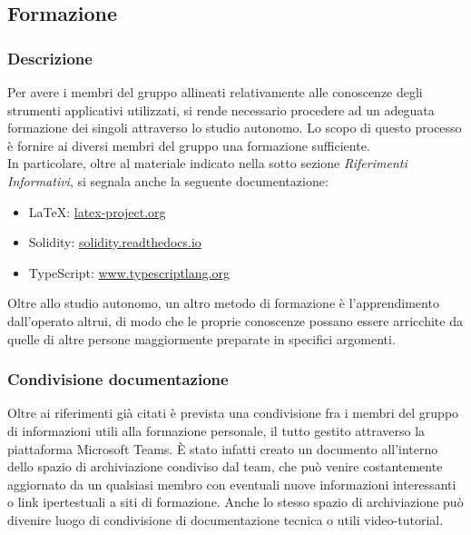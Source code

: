 \subsection{Formazione}
		\subsubsection{Descrizione}	
		Per avere i membri del gruppo \Gruppo{} allineati relativamente alle conoscenze degli strumenti applicativi utilizzati, si rende necessario procedere ad un adeguata formazione dei singoli attraverso lo studio autonomo. Lo scopo di questo processo è fornire ai diversi membri del gruppo una formazione sufficiente.\\
		In particolare, oltre al materiale indicato nella sotto sezione \textit{Riferimenti Informativi}, si segnala anche la seguente documentazione:
		\begin{itemize}
			\item \LaTeX{}: \href{latex-project.org}{latex-project.org}
			\item Solidity: \href{solidity.readthedocs.io}{solidity.readthedocs.io}
			\item TypeScript: \href{www.typescriptlang.org}{www.typescriptlang.org}
		\end{itemize}
		Oltre allo studio autonomo, un altro metodo di formazione è l'apprendimento dall'operato altrui, di modo che le proprie conoscenze possano essere arricchite da quelle di altre persone maggiormente preparate in specifici argomenti.
		
		\subsubsection{Condivisione documentazione}
		Oltre ai riferimenti già citati è prevista una condivisione fra i membri del gruppo di informazioni utili alla formazione personale, il tutto gestito attraverso la piattaforma Microsoft Teams. È stato infatti creato un documento all'interno dello spazio di archiviazione condiviso dal team, che può venire costantemente aggiornato da un qualsiasi membro con eventuali nuove informazioni interessanti o link ipertestuali a siti di formazione. Anche lo stesso spazio di archiviazione può divenire luogo di condivisione di documentazione tecnica o utili video-tutorial.
